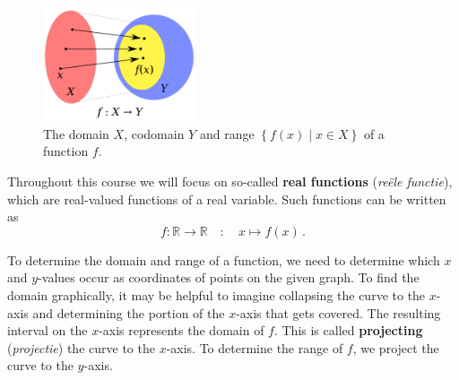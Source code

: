 \begin{figure}[h!]
	\begin{center}
	\includegraphics[width=0.4\textwidth]{figures/Functions/fig_functions_10.png}
	\caption{The domain $X$, codomain $Y$ and range $\left\{f(x)\mid x\in X\right\}$ of a function $f$.}
	\label{fig_functions_10}
	\end{center}
\end{figure}

Throughout this course we will focus on so-called \textbf{real functions} (\textit{re\"ele functie}), which are real-valued functions of a real variable. Such functions can be written as 
$$
f:\mathbb{R}\to\mathbb{R}\quad:\quad x\mapsto f(x)\,.
$$


\ifvc
To determine the domain and range of a function, we need to determine which $x$ and $y$-values occur as coordinates of points on the given graph.  To find the domain graphically, it may be helpful to imagine collapsing the curve to the $x$-axis and determining the portion of the $x$-axis that gets covered. The resulting interval on the $x$-axis represents the domain of $f$. This is called \textbf{projecting} (\textit{projectie}) the curve to the $x$-axis. To determine the range of $f$, we project the curve to the $y$-axis. 

